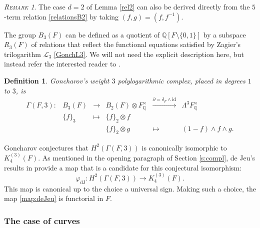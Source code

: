 \documentclass[11pt,a4,leqno]{amsart}
\theoremstyle{my theoremstyle}
\theoremstyle{dfn}
\newtheorem{dfn}[thm]{Definition}
\theoremstyle{remark}
\newtheorem{rmk}[thm]{{\scshape Remark}}
\renewcommand{\1}{\mathbbm{1}}
\newcommand{\Q}{\mathbb{Q}}
\numberwithin{equation}{section}
\begin{document}
\begin{rmk}
    The case $d=2$ of Lemma \ref{rel2} can also be derived directly from the $5$-term relation \eqref{relationsB2} by taking $(f,g)=(f, f^{-1})$.  
\end{rmk}

The group $B_3(F)$ can be defined as a quotient of $\Q[F\setminus \{ 0,1 \}]$ by a subspace $R_3(F)$ of relations that reflect the functional equations satisfied by Zagier's trilogarithm $\mathcal{L}_3$ \eqref{GonchL3}. We will not need the explicit description here, but instead refer the interested reader to \cite[p. 214 \& 218]{Goncharov}.  


\begin{dfn}\label{def:complex}
    Goncharov's weight $3$ polylogarithmic complex, placed in degrees $1$ to $3$, is 
\[
\begin{array}{cccccc}
    \Gamma(F,3) \colon & B_{3}(F) & \longrightarrow & B_{2}(F) \otimes F_{\Q}^\times & \overset{\partial=\delta_F\wedge \mathrm{id}}{\longrightarrow} & \Lambda^3 F_{\Q}^\times  \\
     & \{ f \}_3 &  \longmapsto & \{ f \}_2 \otimes f & &  \\
     & & & \{ f \}_2 \otimes g & \longmapsto & (1-f)\wedge f \wedge g.
\end{array}
\]
\end{dfn}

Goncharov \cite[Conjecture A and
Conjecture 1.17, p. 222–223]{Goncharov} conjectures that $H^2(\Gamma(F,3))$ is canonically isomorphic to $K_4^{(3)}(F)$. As mentioned in the opening paragraph of Section \ref{s:compl}, de Jeu's results in \cite{Jeu95,Jeu96} provide a map that is a candidate for this conjectural isomorphism: 
\begin{equation}\label{map:deJeu}
    \varphi_{\mathrm{dJ}} \colon H^2(\Gamma(F,3)) \longrightarrow K_4^{(3)}(F).
\end{equation}
This map is canonical up to the choice a universal sign. Making such a choice, the map \eqref{map:deJeu} is functorial in $F$.

\subsubsection{The case of curves}
\end{document}
